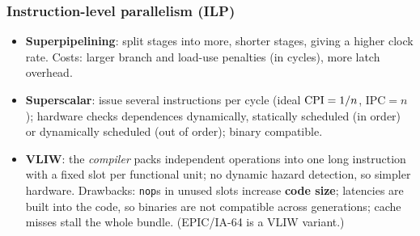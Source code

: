 \subsubsection{Instruction-level parallelism (ILP)}
\begin{itemize}[leftmargin=*]
  \item \textbf{Superpipelining}: split stages into more, shorter stages, giving a
  higher clock rate. Costs: larger branch and load-use penalties (in cycles), more
  latch overhead.
  \item \textbf{Superscalar}: issue several instructions per cycle (ideal
  $\mathrm{CPI}=1/n$, $\text{IPC}=n$); hardware checks dependences dynamically, statically
  scheduled (in order) or dynamically scheduled (out of order); binary compatible.
  \item \textbf{VLIW}: the \emph{compiler} packs independent operations into one
  long instruction with a fixed slot per functional unit; no dynamic hazard
  detection, so simpler hardware. Drawbacks: \texttt{nop}s in unused slots increase
  \textbf{code size}; latencies are built into the code, so binaries are not
  compatible across generations; cache misses stall the whole bundle. (EPIC/IA-64 is
  a VLIW variant.)
\end{itemize}

